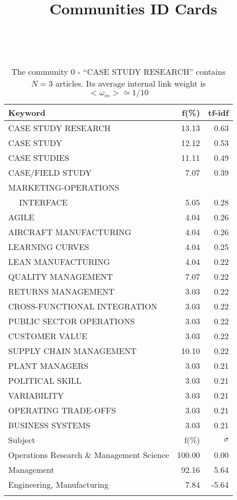 \documentclass[a4paper,11pt]{report}
\title{{\bf Communities ID Cards}}
\date{\begin{flushleft}This document gather the ``ID Cards'' of the CC communities found within your database.\\
 The CC network was built by keeping a link between articles sharing at least 5 references. The communities characterized here correspond to the ones found in the level 0 (in the sense of the Louvain algo) which gathers more than 0 articles.\\
 These ID cards displays the most frequent keywords, subject categories, journals of publication, institution, countries, authors, references and reference journals of the articles of each community. The significance of an item $\sigma = \sqrt{N} (f - p) / \sqrt{p(1-p)}$ [where $N$ is the number of articles within the community and $f$ and $p$ are the proportion of articles respectively within the community and within the database displaying that item ] is also given (for example $\sigma > 5$ is really highly significant). The tf-idf value which can be calculated by $tf-idf = f*log(frac{1}{p})$ is also given.\\
\vspace{1cm}
\copyright Sebastian Grauwin, Liu Weizhi - (2014) \end{flushleft}}
\begin{document}
\begin{landscape}
\maketitle
\clearpage

\begin{table}[!ht]
\caption{The community 0 - ``CASE STUDY RESEARCH'' contains $N = 3$ articles. Its average internal link weight is $<\omega_{in}> \simeq 1/10$ }
\textcolor{white}{aa}\\
{\scriptsize\begin{tabular}{|l r  r|}
\hline
Keyword & f(\%) & tf-idf \\
\hline
CASE STUDY RESEARCH & 13.13 & 0.63\\
CASE STUDY & 12.12 & 0.53\\
CASE STUDIES & 11.11 & 0.49\\
CASE/FIELD STUDY & 7.07 & 0.39\\
MARKETING-OPERATIONS &  &\\
$\quad$ INTERFACE & 5.05 & 0.28\\
AGILE & 4.04 & 0.26\\
AIRCRAFT MANUFACTURING & 4.04 & 0.26\\
LEARNING CURVES & 4.04 & 0.25\\
LEAN MANUFACTURING & 4.04 & 0.22\\
QUALITY MANAGEMENT & 7.07 & 0.22\\
RETURNS MANAGEMENT & 3.03 & 0.22\\
CROSS-FUNCTIONAL INTEGRATION & 3.03 & 0.22\\
PUBLIC SECTOR OPERATIONS & 3.03 & 0.22\\
CUSTOMER VALUE & 3.03 & 0.22\\
SUPPLY CHAIN MANAGEMENT & 10.10 & 0.22\\
PLANT MANAGERS & 3.03 & 0.21\\
POLITICAL SKILL & 3.03 & 0.21\\
VARIABILITY & 3.03 & 0.21\\
OPERATING TRADE-OFFS & 3.03 & 0.21\\
BUSINESS SYSTEMS & 3.03 & 0.21\\
\hline
\hline
Subject & f(\%) & $\sigma$\\
\hline
Operations Research \& Management Science & 100.00 & 0.00\\
Management & 92.16 & 5.64\\
Engineering, Manufacturing & 7.84 & -5.64\\
 &  & \\

\end{tabular}}
\end{table}
\end{landscape}
\end{document}
